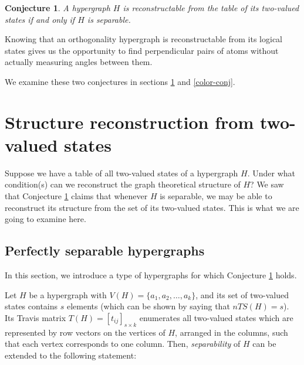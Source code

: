 \documentclass[%
12pt,
prereprint,
showpacs,
showkeys,
preprintnumbers,
amsmath,amssymb,
aps,
pra,
longbibliography,
notitlepage
]{revtex4-1}
\newtheorem{conjecture}[theorem]{{\color{THM}Conjecture}}
\theoremstyle{definition}
\begin{document}
        \begin{conjecture} \label{c2} A hypergraph $H$ is reconstructable from the table of its two-valued states if and only if $H$ is separable.
        \end{conjecture}

        Knowing that an orthogonality hypergraph is reconstructable from its logical states gives us the opportunity to find perpendicular pairs of atoms without actually measuring angles between them.

        We examine these two conjectures in sections \ref{construction-conj} and \ref{color-conj}.







        \section{Structure reconstruction from two-valued states}\label{construction-conj}

        Suppose we have a table of all two-valued states of a hypergraph $H$. Under what condition(s) can we reconstruct the graph theoretical structure of $H$? We saw that Conjecture \ref{c2} claims that whenever $H$ is separable, we may be able to reconstruct its structure from the set of its two-valued states. This is what we are going to examine here.

        \subsection{Perfectly separable hypergraphs}




        In this section, we introduce a type of hypergraphs for which Conjecture \ref{c2} holds.

        Let $H$ be a hypergraph with $V(H)=\{a_1, a_2,\ldots, a_k\}$, and its set of two-valued states contains $s$ elements (which can be shown by saying that $nTS(H)=s$). Its Travis matrix $T(H) =[t_{ij}]_{s\times k}$ enumerates all two-valued states which are represented by row vectors on the vertices of $H$, arranged in the columns, such that each vertex corresponds to one column. Then, \emph{separability} of $H$ can be extended to the following statement:
\end{document}
